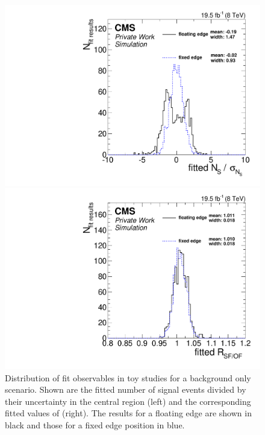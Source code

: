 \begin{figure}[h]
  \centering
  \begin{minipage}[t]{0.49\textwidth}
    \includegraphics[width=\textwidth]{plots/results/fit/toyResults/nS_floatVsFixed.pdf}
  \end{minipage}
  \begin{minipage}[t]{0.49\textwidth}
    \includegraphics[width=\textwidth]{plots/results/fit/toyResults/rSFOF_floatVsFixed.pdf}
  \end{minipage}

  \caption{Distribution of fit observables in toy studies for a background only scenario. Shown are the fitted number of signal events divided by their uncertainty in the central region (left) and the corresponding fitted values of \Rsfof (right). The results for a floating edge are shown in black and those for a fixed edge position in blue.}
  \label{fig:toys:backgroundOnly}
\end{figure}

